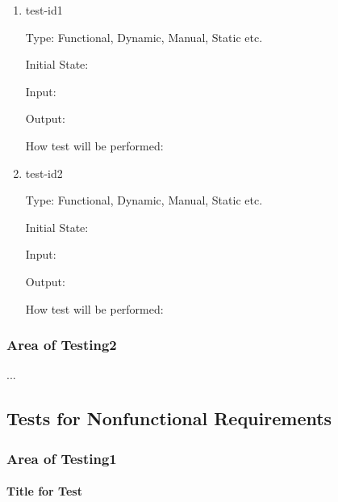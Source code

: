 \documentclass[12pt, titlepage]{article}
\begin{document}
		\begin{enumerate}

			\item{test-id1\\}

			Type: Functional, Dynamic, Manual, Static etc.
								
			Initial State: 
								
			Input: 
								
			Output: 
								
			How test will be performed: 
								
			\item{test-id2\\}

			Type: Functional, Dynamic, Manual, Static etc.
								
			Initial State: 
								
			Input: 
								
			Output: 
								
			How test will be performed: 

		\end{enumerate}

	\subsubsection{Area of Testing2}

	...

	\subsection{Tests for Nonfunctional Requirements}

	\subsubsection{Area of Testing1}
			
		\paragraph{Title for Test}
\end{document}
